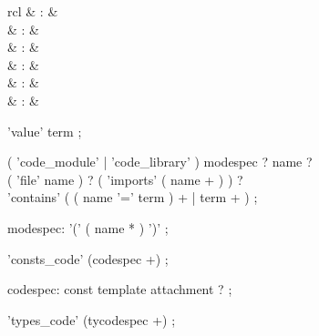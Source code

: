 \begin{isabellebody}
\begin{isamarkuptext}
  \begin{matharray}{rcl}
    \hypertarget{command.HOL.value}{\hyperlink{command.HOL.value}{\mbox{}}}\isa{{\isachardoublequote}\isactrlsup {\isacharasterisk}{\isachardoublequote}} & : &  \\
    \hypertarget{command.HOL.code-module}{\hyperlink{command.HOL.code-module}{\mbox{}}} & : &  \\
    \hypertarget{command.HOL.code-library}{\hyperlink{command.HOL.code-library}{\mbox{}}} & : &  \\
    \hypertarget{command.HOL.consts-code}{\hyperlink{command.HOL.consts-code}{\mbox{}}} & : &  \\
    \hypertarget{command.HOL.types-code}{\hyperlink{command.HOL.types-code}{\mbox{}}} & : &  \\  
    \hypertarget{attribute.HOL.code}{\hyperlink{attribute.HOL.code}{\mbox{}}} & : &  \\
  \end{matharray}

  \begin{rail}
  'value' term
  ;

  ( 'code\_module' | 'code\_library' ) modespec ? name ? \\
    ( 'file' name ) ? ( 'imports' ( name + ) ) ? \\
    'contains' ( ( name '=' term ) + | term + )
  ;

  modespec: '(' ( name * ) ')'
  ;

  'consts\_code' (codespec +)
  ;

  codespec: const template attachment ?
  ;

  'types\_code' (tycodespec +)
  ;


\end{rail}
\end{isamarkuptext}
\end{isabellebody}
